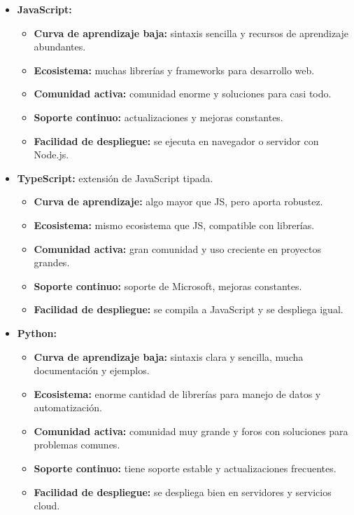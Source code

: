 \begin{itemize}
    \item \textbf{JavaScript: }
    \begin{itemize}
        \item \textbf{Curva de aprendizaje baja:} sintaxis sencilla
        y recursos de aprendizaje abundantes.
        \item \textbf{Ecosistema:} muchas librerías y frameworks
        para desarrollo web.
        \item \textbf{Comunidad activa:} comunidad enorme y
        soluciones para casi todo.
        \item \textbf{Soporte continuo:} actualizaciones y mejoras
        constantes.
        \item \textbf{Facilidad de despliegue:} se ejecuta en
        navegador o servidor con Node.js.
    \end{itemize}

    \item \textbf{TypeScript: }extensión de JavaScript tipada.
    \begin{itemize}
        \item \textbf{Curva de aprendizaje:} algo mayor que JS,
        pero aporta robustez.
        \item \textbf{Ecosistema:} mismo ecosistema que JS,
        compatible con librerías.
        \item \textbf{Comunidad activa:} gran comunidad y
        uso creciente en proyectos grandes.
        \item \textbf{Soporte continuo:} soporte de Microsoft,
        mejoras constantes.
        \item \textbf{Facilidad de despliegue:} se compila a
        JavaScript y se despliega igual.
    \end{itemize}
        
    \item \textbf{Python: }
        \begin{itemize}
        \item \textbf{Curva de aprendizaje baja:} sintaxis clara y sencilla, 
        mucha documentación y ejemplos.
        \item \textbf{Ecosistema:} enorme cantidad de librerías para 
        manejo de datos y automatización.
        \item \textbf{Comunidad activa:} comunidad muy grande y foros 
        con soluciones para problemas comunes.
        \item \textbf{Soporte continuo:} tiene soporte estable y 
        actualizaciones frecuentes.
        \item \textbf{Facilidad de despliegue:} se despliega bien 
        en servidores y servicios cloud.
    \end{itemize}


\end{itemize}
